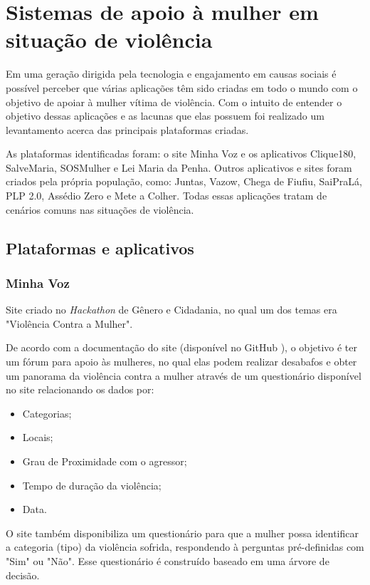 \chapter{Sistemas de apoio à mulher em situação de violência} \label{cap:sistemas_relacionados}

Em uma geração dirigida pela tecnologia e engajamento em causas sociais é possível perceber que várias aplicações têm sido criadas em todo o mundo 
com o objetivo de apoiar à mulher vítima de violência. Com o intuito de entender o objetivo dessas aplicações e as lacunas que elas possuem
foi realizado um levantamento acerca das principais plataformas criadas. 

As plataformas identificadas foram: o site Minha Voz \cite{minhavoz_site} e 
os aplicativos Clique180, SalveMaria, SOSMulher e Lei Maria da Penha. Outros aplicativos e sites foram criados pela própria população, como: Juntas, Vazow, 
Chega de Fiufiu, 
SaiPraLá, PLP 2.0, Assédio Zero e Mete a Colher. Todas essas aplicações tratam de cenários comuns nas situações de 
violência.

\section{Plataformas e aplicativos}

\subsection*{Minha Voz}

Site criado no \textit{Hackathon} de Gênero e Cidadania, no qual
um dos temas era "Violência Contra a Mulher". 

De acordo com a documentação do site (disponível no GitHub \cite{minhavoz_repo}), o objetivo é ter um fórum para apoio às mulheres, no qual elas podem
realizar desabafos e obter um panorama da violência contra a mulher através de um questionário
disponível no site relacionando os dados por:

\begin{itemize}
	\item Categorias;
	\item Locais;
	\item Grau de Proximidade com o agressor;
	\item Tempo de duração da violência;
	\item Data.
\end{itemize}

O site também disponibiliza um questionário para que a mulher possa identificar a categoria (tipo) da violência sofrida, respondendo à perguntas pré-definidas 
com "Sim" ou "Não". Esse questionário é construído baseado em uma árvore de decisão.

